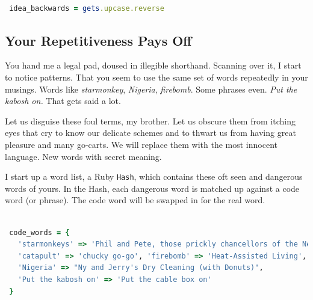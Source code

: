 \documentclass[10pt,twoside]{report}
\begin{document}
\begin{lstlisting}[basicstyle=\ttfamily\color{basiccolor},
    commentstyle = \ttfamily\color{commentcolor},
    keywordstyle=\ttfamily\color{keywordscolor},
    stringstyle=\color{stringcolor},
    language=Ruby,
    basicstyle=\small\ttfamily,
    showstringspaces=false,
  ]

 idea_backwards = gets.upcase.reverse

\end{lstlisting}




\subsection{Your Repetitiveness Pays Off}



You hand me a legal pad, doused in illegible shorthand.  Scanning over
it, I start to notice patterns.  That you seem to use the same set of
words repeatedly in your musings.  Words like {\em starmonkey}, {\em
  Nigeria}, {\em firebomb}.  Some phrases even.  {\em Put the kabosh
  on.} That gets said a lot.

Let us disguise these foul terms, my brother.  Let us obscure them
from itching eyes that cry to know our delicate schemes and to thwart
us from having great pleasure and many go-carts. We will replace them
with the most innocent language.  New words with secret meaning.

I start up a word list, a Ruby \lstinline[breaklines=true]|Hash|,
which contains these oft seen and dangerous words of yours. In the
Hash, each dangerous word is matched up against a code word (or
phrase).  The code word will be swapped in for the real word.


\begin{lstlisting}[basicstyle=\ttfamily\color{basiccolor},
    commentstyle = \ttfamily\color{commentcolor},
    keywordstyle=\ttfamily\color{keywordscolor},
    stringstyle=\color{stringcolor},
    language=Ruby,
    basicstyle=\small\ttfamily,
    showstringspaces=false,
  ]

 code_words = {
   'starmonkeys' => 'Phil and Pete, those prickly chancellors of the New Reich',
   'catapult' => 'chucky go-go', 'firebomb' => 'Heat-Assisted Living',
   'Nigeria' => "Ny and Jerry's Dry Cleaning (with Donuts)",
   'Put the kabosh on' => 'Put the cable box on'
 }

\end{lstlisting}
\end{document}
